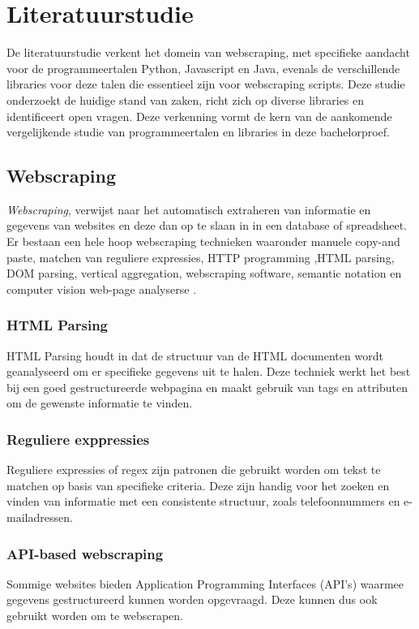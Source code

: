 
\section{Literatuurstudie}
\label{sec:Literatuurstudie}

De literatuurstudie verkent het domein van webscraping, met specifieke aandacht voor de programmeertalen Python, Javascript en Java,
evenals de verschillende libraries voor deze talen die essentieel zijn voor webscraping scripts.
Deze studie onderzoekt de huidige stand van zaken, richt zich op diverse libraries en identificeert open vragen. 
Deze verkenning vormt de kern van de aankomende vergelijkende studie van programmeertalen en libraries in deze bachelorproef.

\subsection{Webscraping}

\textit{Webscraping}, verwijst naar het automatisch extraheren van informatie en gegevens van websites en deze dan op te slaan in 
in een database of spreadsheet.
Er bestaan een hele hoop webscraping technieken waaronder manuele copy-and paste, matchen van reguliere expressies, HTTP programming
,HTML parsing, DOM parsing, vertical aggregation, webscraping software, semantic notation en computer vision web-page analyserse
\autocite{DeSSirisuriya2015}.

\subsubsection{HTML Parsing}
HTML Parsing houdt in dat de structuur van de HTML documenten wordt geanalyseerd om er specifieke gegevens uit te halen.
Deze techniek werkt het best bij een goed gestructureerde webpagina en maakt gebruik van tags en attributen om de gewenste informatie
te vinden.

\subsubsection{Reguliere exppressies}
Reguliere expressies of regex zijn patronen die gebruikt worden om tekst te matchen op basis van specifieke criteria.
Deze zijn handig voor het zoeken en vinden van informatie met een consistente structuur, zoals telefoonnummers en e-mailadressen.

\subsubsection{API-based webscraping}
Sommige websites bieden Application Programming Interfaces (API's) waarmee gegevens gestructureerd kunnen worden opgevraagd. 
Deze kunnen dus ook gebruikt worden om te webscrapen.

